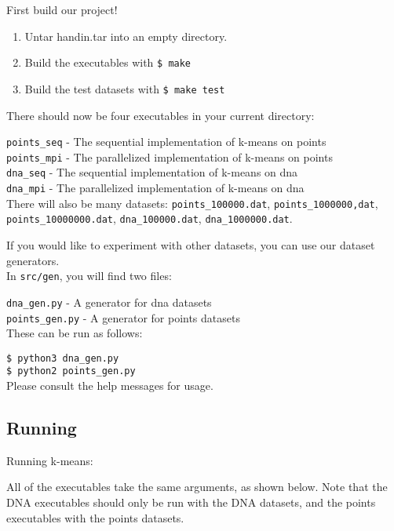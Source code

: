 \documentclass[12pt]{article}
\begin{document}
First build our project!

\begin{enumerate}
\item Untar handin.tar into an empty directory.
\item Build the executables with \texttt{\$ make}
\item Build the test datasets with \texttt{\$ make test}
\end{enumerate}

There should now be four executables in your current directory: 


\texttt{points\_seq} - The sequential implementation of k-means on points \\
\texttt{points\_mpi} - The parallelized implementation of k-means on points \\
\texttt{dna\_seq} - The sequential implementation of k-means on dna \\
\texttt{dna\_mpi} - The parallelized implementation of k-means on dna \\

There will also be many datasets: \texttt{points\_100000.dat},
\texttt{points\_1000000,dat}, \texttt{points\_10000000.dat},
\texttt{dna\_100000.dat}, \texttt{dna\_1000000.dat}.

 If you would like to experiment with other datasets, you can use our dataset generators.\\


 In \texttt{src/gen}, you will find two files: 


 \texttt{dna\_gen.py} - A generator for dna datasets \\
 \texttt{points\_gen.py} - A generator for points datasets \\


 These can be run as follows:


 \texttt{\$ python3 dna\_gen.py} \\
 \texttt{\$ python2 points\_gen.py} \\

 Please consult the help messages for usage.

 \subsection{Running}

Running k-means:

All of the executables take the same arguments, as shown below. Note that the DNA executables should only be run with the DNA datasets, and the points executables with the points datasets.
\end{document}
